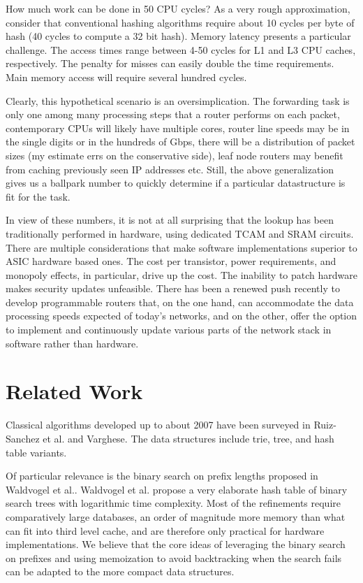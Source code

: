 \documentclass[conference,compsoc]{IEEEtran}
\begin{document}
How much work can be done in 50 CPU cycles? As a very rough approximation,
consider that conventional hashing algorithms require about 10 cycles 
per byte of hash (40 cycles to compute a 32 bit hash). Memory latency
presents a particular challenge. The access times range between 4-50 cycles
for L1 and L3 CPU caches, respectively. The penalty for misses can easily 
double the time requirements. Main memory access will require several hundred 
cycles.

Clearly, this hypothetical scenario is an oversimplication. The forwarding
task is only one among many processing steps that a router performs on each
packet, contemporary CPUs will likely have multiple cores, router line
speeds may be in the single digits or in the hundreds of Gbps, there will 
be a distribution of packet sizes (my estimate errs on the conservative
side), leaf node routers may benefit from caching previously seen IP
addresses etc. Still, the above generalization gives us a ballpark number 
to quickly determine if a particular datastructure is fit for the task.

In view of these numbers, it is not at all surprising that the lookup has 
been traditionally performed in hardware, using dedicated TCAM and SRAM 
circuits. There are multiple considerations that make software 
implementations superior to ASIC hardware based ones. The cost per 
transistor, power requirements, and monopoly effects, in particular, 
drive up the cost. The inability to patch hardware makes security updates
unfeasible. There has been a renewed push recently to develop 
programmable routers that, on the one hand, can accommodate the data 
processing speeds expected of today's networks, and on the other, offer 
the option to implement and continuously update various parts of the 
network stack in software rather than hardware.


\section{Related Work}
Classical algorithms developed up to about 2007 have been surveyed in
Ruiz-Sanchez et al.\cite{Sanchez:Survey} and 
Varghese\cite{Varghese:Algorithmics}. The data structures include trie,
tree, and hash table variants. 

Of particular relevance is the binary search on prefix lengths 
proposed in Waldvogel et al.\cite{Waldvogel:Scalable}. 
Waldvogel et al. propose a very elaborate
hash table of binary search trees with logarithmic time complexity. Most 
of the refinements require comparatively large databases, an order of 
magnitude more memory than what can fit into third level
cache, and are therefore only practical for hardware implementations. We
believe that the core ideas of leveraging the binary search on prefixes and 
using memoization to avoid backtracking when the search fails can be
adapted to the more compact data structures.
\end{document}
